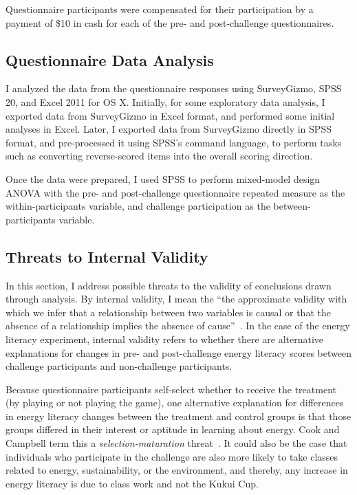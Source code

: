 Questionnaire participants were compensated for their participation by a payment of \$10 in cash for each of the pre- and post-challenge questionnaires.


\subsection{Questionnaire Data Analysis}

I analyzed the data from the questionnaire responses using SurveyGizmo, SPSS 20, and Excel 2011 for OS X. Initially, for some exploratory data analysis, I exported data from SurveyGizmo in Excel format, and performed some initial analyses in Excel. Later, I exported data from SurveyGizmo directly in SPSS format, and pre-processed it using SPSS's command language, to perform tasks such as converting reverse-scored items into the overall scoring direction.

Once the data were prepared, I used SPSS to perform mixed-model design ANOVA  with the pre- and post-challenge questionnaire repeated measure as the within-participants variable, and challenge participation as the between-participants variable.


\subsection{Threats to Internal Validity}
\label{sec:internal-validity-threats}

In this section, I address possible threats to the validity of conclusions drawn through analysis. By internal validity, I mean the ``the approximate validity with which we infer that a relationship between two variables is causal or that the absence of a relationship implies the absence of cause''~\cite[p. 37]{Cook1979}. In the case of the energy literacy experiment, internal validity refers to whether there are alternative explanations for changes in pre- and post-challenge energy literacy scores between challenge participants and non-challenge participants.

Because questionnaire participants self-select whether to receive the treatment (by playing or not playing the game), one alternative explanation for differences in energy literacy changes between the treatment and control groups is that those groups differed in their interest or aptitude in learning about energy. Cook and Campbell term this a \emph{selection-maturation} threat~\cite[p. 53]{Cook1979}. It could also be the case that individuals who participate in the challenge are also more likely to take classes related to energy, sustainability, or the environment, and thereby, any increase in energy literacy is due to class work and not the Kukui Cup.

